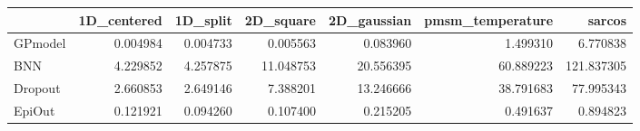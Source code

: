 \begin{tabular}{lrrrrrr}
\toprule
{} &  1D\_centered &  1D\_split &  2D\_square &  2D\_gaussian &  pmsm\_temperature &      sarcos \\
\midrule
GPmodel &     0.004984 &  0.004733 &   0.005563 &     0.083960 &          1.499310 &    6.770838 \\
BNN     &     4.229852 &  4.257875 &  11.048753 &    20.556395 &         60.889223 &  121.837305 \\
Dropout &     2.660853 &  2.649146 &   7.388201 &    13.246666 &         38.791683 &   77.995343 \\
EpiOut  &     0.121921 &  0.094260 &   0.107400 &     0.215205 &          0.491637 &    0.894823 \\
\bottomrule
\end{tabular}
